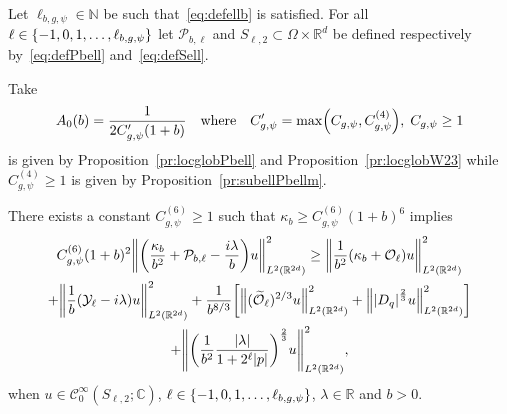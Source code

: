\documentclass[AHL,Unicode,longabstracts]{cedram}
\newcommand{\C}{\mathbb{C}}
\newcommand{\R}{\mathbb{R}}
\newcommand{\N}{\mathbb{N}}
\newcommand{\clC}{\mathcal{C}}
\newcommand{\clY}{\mathcal{Y}}
\newcommand{\clO}{\mathcal{O}}
\newcommand{\clP}{\mathcal{P}}
\let\oldtilde\tilde
\renewcommand*{\tilde}[1]{\mathchoice{\widetilde{#1}}{\widetilde{#1}}{\oldtilde{#1}}{\oldtilde{#1}}}
\let\originalleft\left
\let\originalright\right
\renewcommand{\left}{\mathopen{}\mathclose\bgroup\originalleft}
\renewcommand{\right}{\aftergroup\egroup\originalright}
\begin{document}
\begin{prop}\label{pr:subellPbellSmall}
Let $\ell_{b,g,\psi}\in\N$ be such that~\eqref{eq:defellb} is satisfied. For all $\ell\in \left\{-1,0,1,\dots,\ell_{b,g,\psi}\right\}$ let $\clP_{b,\ell}$ and $S_{\ell,2}\subset \Omega\times \R^{d}$ be defined respectively by~\eqref{eq:defPbell} and~\eqref{eq:defSell}.

Take
\[
A_0(b)=\frac{1}{2C_{{g,\psi}}'(1+b)}\quad\text{where}\quad C_{{g,\psi}}'=\max\left(C_{g,\psi},C_{g,\psi}^{(4)}\right),\; C_{g,\psi}\geq 1
\]
is given by Proposition~\ref{pr:locglobPbell} and Proposition~\ref{pr:locglobW23} while $C_{g,\psi}^{(4)}\geq 1$ is given by Proposition~\ref{pr:subellPbellm}.

There exists a constant $C_{g,\psi}^{(6)}\geq 1$ such that $\kappa_{b}\geq C_{g,\psi}^{(6)}(1+b)^{6}$ implies
\begin{multline}\label{eq:subellPbellSmall}
C_{g,\psi}^{(6)}(1+b)^2
\left\| \left(\frac{\kappa_{b}}{b^{2}} + \clP_{b,\ell} - \frac{i\lambda}{b} \right) u \right\|_{L^2(\R^{2d})}^{2} 
\geq \left\| \frac{1}{b^2}\left(\kappa_b+\clO_{\ell}\right) u\right\|_{L^2(\R^{2d})}^2\\
+\left\| \frac{1}{b}\left(\clY_{\ell}-i \lambda \right)u \right\|_{L^2(\R^{2d})}^2
+\frac{1}{b^{8/3}}\left[\left\|(\tilde{\clO}_{\ell})^{2/3} u\right\|_{L^2(\R^{2d})}^2+ \left\|\left|D_{q} \right|^{\frac{2}{3}} u \right\|_{L^2(\R^{{2d}})}^{2}\right]
\\+ \left\| \left(\frac{1}{b^2} \frac{|\lambda|}{1+2^{\ell}|p|} \right)^{\frac{2}{3}} u \right\|_{L^2(\R^{2d})}^{2} ,
\end{multline}
when $ u \in \clC^\infty_0(S_{\ell,2};\C)$, $\ell\in \left\{-1,0,1,\dots,\ell_{b,g,\psi}\right\}$, $\lambda\in \R$ and $b>0$.
\end{prop}
\end{document}
